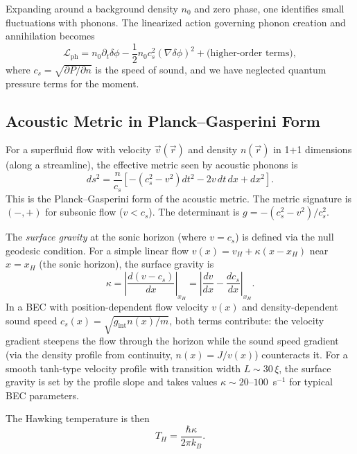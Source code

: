 \documentclass[aps,prl,twocolumn,superscriptaddress,nofootinbib,amsmath,amssymb]{revtex4-2}
\begin{document}
Expanding around a background density $n_0$ and zero phase, one identifies small fluctuations with phonons. The linearized action governing phonon creation and annihilation becomes
\begin{equation}
\label{eq:phonon_lagrangian}
\mathcal{L}_{\text{ph}} = n_0 \partial_t \delta\phi - \frac{1}{2}n_0 c_s^2 (\nabla \delta\phi)^2 + \text{(higher-order terms)},
\end{equation}
where $c_s = \sqrt{\partial P / \partial n}$ is the speed of sound, and we have neglected quantum pressure terms for the moment.

\subsection{Acoustic Metric in Planck--Gasperini Form}

For a superfluid flow with velocity $\vec{v}(\vec{r})$ and density $n(\vec{r})$ in 1+1 dimensions (along a streamline), the effective metric seen by acoustic phonons is \cite{Unruh1981}
\begin{equation}
\label{eq:acoustic_metric}
ds^2 = \frac{n}{c_s} \left[ -(c_s^2 - v^2) dt^2 - 2v \, dt \, dx + dx^2 \right].
\end{equation}
This is the Planck--Gasperini form of the acoustic metric. The metric signature is $(-,+)$ for subsonic flow ($v < c_s$). The determinant is $g = -(c_s^2 - v^2)/c_s^2$.

The \emph{surface gravity} at the sonic horizon (where $v = c_s$) is defined via the null geodesic condition. For a simple linear flow $v(x) = v_H + \kappa (x - x_H)$ near $x = x_H$ (the sonic horizon), the surface gravity is
\begin{equation}
\label{eq:surface_gravity}
\kappa = \left|\frac{d(v - c_s)}{dx}\right|_{x_H} = \left|\frac{dv}{dx} - \frac{dc_s}{dx}\right|_{x_H}.
\end{equation}
In a BEC with position-dependent flow velocity $v(x)$ and density-dependent sound speed $c_s(x) = \sqrt{g_{\text{int}} n(x)/m}$, both terms contribute: the velocity gradient steepens the flow through the horizon while the sound speed gradient (via the density profile from continuity, $n(x) = J/v(x)$) counteracts it. For a smooth tanh-type velocity profile with transition width $L \sim 30\,\xi$, the surface gravity is set by the profile slope and takes values $\kappa \sim 20$--$100$~s$^{-1}$ for typical BEC parameters.

The Hawking temperature is then
\begin{equation}
\label{eq:hawking_temp}
T_H = \frac{\hbar \kappa}{2\pi k_B}.
\end{equation}
\end{document}
